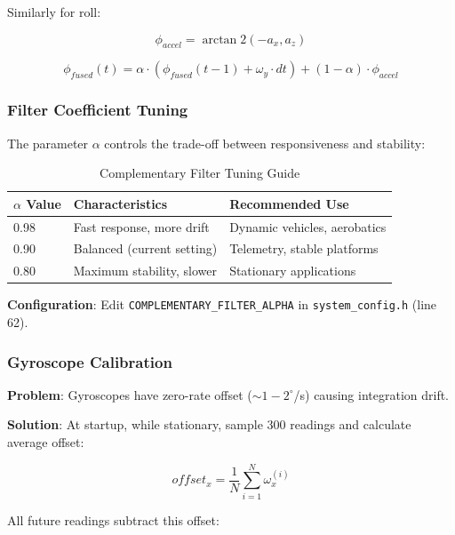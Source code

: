 \documentclass[11pt,a4paper]{article}
\begin{document}
Similarly for roll:

\begin{equation}
\phi_{accel} = \arctan2(-a_x, a_z)
\end{equation}

\begin{equation}
\phi_{fused}(t) = \alpha \cdot (\phi_{fused}(t-1) + \omega_y \cdot dt) + (1-\alpha) \cdot \phi_{accel}
\end{equation}

\subsubsection{Filter Coefficient Tuning}

The parameter $\alpha$ controls the trade-off between responsiveness and stability:

\begin{table}[H]
\centering
\begin{tabular}{@{}lll@{}}
\toprule
\textbf{$\alpha$ Value} & \textbf{Characteristics} & \textbf{Recommended Use} \\
\midrule
0.98 & Fast response, more drift & Dynamic vehicles, aerobatics \\
0.90 & Balanced (current setting) & Telemetry, stable platforms \\
0.80 & Maximum stability, slower & Stationary applications \\
\bottomrule
\end{tabular}
\caption{Complementary Filter Tuning Guide}
\end{table}

\textbf{Configuration}: Edit \texttt{COMPLEMENTARY\_FILTER\_ALPHA} in \texttt{system\_config.h} (line 62).

\subsubsection{Gyroscope Calibration}

\textbf{Problem}: Gyroscopes have zero-rate offset ($\sim 1-2^\circ$/s) causing integration drift.

\textbf{Solution}: At startup, while stationary, sample 300 readings and calculate average offset:

\begin{equation}
offset_x = \frac{1}{N}\sum_{i=1}^{N} \omega_x^{(i)}
\end{equation}

All future readings subtract this offset:
\end{document}
